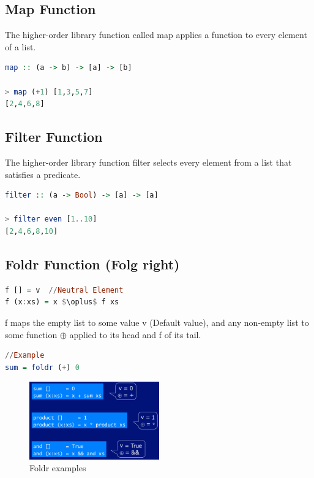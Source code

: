 \hypertarget{map-function}{%
\subsection{Map Function}\label{map-function}}

The higher-order library function called map applies a function to every
element of a list.

\begin{lstlisting}[language=Haskell]
map :: (a -> b) -> [a] -> [b]

> map (+1) [1,3,5,7]
[2,4,6,8]
\end{lstlisting}

\hypertarget{filter-function}{%
\subsection{Filter Function}\label{filter-function}}

The higher-order library function filter selects every element from a
list that satisfies a predicate.

\begin{lstlisting}[language=Haskell]
filter :: (a -> Bool) -> [a] -> [a]

> filter even [1..10]
[2,4,6,8,10]
\end{lstlisting}

\clearpage
\hypertarget{foldr-function-folg-right}{%
\subsection{Foldr Function (Folg
right)}\label{foldr-function-folg-right}}

\begin{lstlisting}[language=Haskell]
f [] = v  //Neutral Element
f (x:xs) = x $\oplus$ f xs
\end{lstlisting}

f maps the empty list to some value v (Default value), and any non-empty
list to some function $\oplus$  applied to its head and f of its tail.

\begin{lstlisting}[language=Haskell]
//Example
sum = foldr (+) 0
\end{lstlisting}

\begin{figure}[H]
\centering
\includegraphics[width=0.5\textwidth]{figures/fold_examples.png}
\caption{Foldr examples}
\end{figure}


